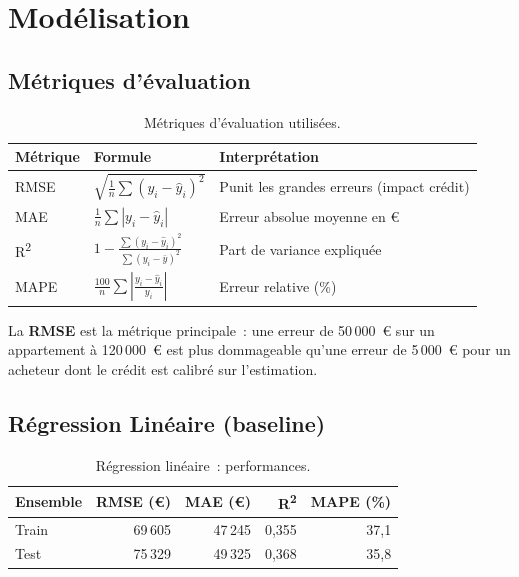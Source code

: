 \documentclass[12pt,a4paper]{article}
\begin{document}
\newpage
\section{Mod\'elisation}
\label{sec:modelisation}

\subsection{M\'etriques d'\'evaluation}

\begin{table}[H]
\centering
\caption{M\'etriques d'\'evaluation utilis\'ees.}
\label{tab:metriques}
\small
\begin{tabular}{llp{7cm}}
\toprule
\textbf{M\'etrique} & \textbf{Formule} & \textbf{Interpr\'etation} \\
\midrule
RMSE & $\sqrt{\frac{1}{n}\sum(y_i - \hat{y}_i)^2}$ & Punit les grandes erreurs (impact cr\'edit) \\
MAE  & $\frac{1}{n}\sum|y_i - \hat{y}_i|$ & Erreur absolue moyenne en \euro{} \\
R\textsuperscript{2}   & $1 - \frac{\sum(y_i-\hat{y}_i)^2}{\sum(y_i-\bar{y})^2}$ & Part de variance expliqu\'ee \\
MAPE & $\frac{100}{n}\sum\left|\frac{y_i-\hat{y}_i}{y_i}\right|$ & Erreur relative (\%) \\
\bottomrule
\end{tabular}
\end{table}

La \textbf{RMSE} est la m\'etrique principale~: une erreur de 50\,000~\euro{} sur un appartement \`a 120\,000~\euro{} est plus dommageable qu'une erreur de 5\,000~\euro{} pour un acheteur dont le cr\'edit est calibr\'e sur l'estimation.

\subsection{R\'egression Lin\'eaire (baseline)}

\begin{table}[H]
\centering
\caption{R\'egression lin\'eaire~: performances.}
\label{tab:lr}
\begin{tabular}{lrrrr}
\toprule
\textbf{Ensemble} & \textbf{RMSE (\euro)} & \textbf{MAE (\euro)} & \textbf{R\textsuperscript{2}} & \textbf{MAPE (\%)} \\
\midrule
Train & 69\,605 & 47\,245 & 0{,}355 & 37{,}1 \\
Test  & 75\,329 & 49\,325 & 0{,}368 & 35{,}8 \\
\bottomrule
\end{tabular}
\end{table}
\end{document}
